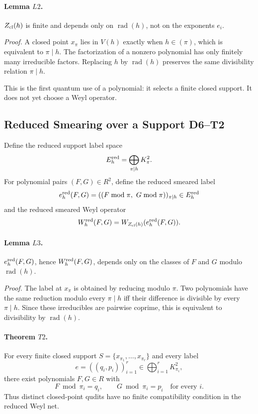 \paragraph{Lemma \(L2\).}
\(Z_{\rm cl}(h)\) is finite and depends only on \(\operatorname{rad}(h)\), not
on the exponents \(e_i\).

\emph{Proof.}
A closed point \(x_\pi\) lies in \(V(h)\) exactly when \(h\in(\pi)\), which is
equivalent to \(\pi\mid h\).  The factorization of a nonzero polynomial has
only finitely many irreducible factors.  Replacing \(h\) by
\(\operatorname{rad}(h)\) preserves the same divisibility relation
\(\pi\mid h\).

This is the first quantum use of a polynomial: it selects a finite closed
support.  It does not yet choose a Weyl operator.

\subsection{Reduced Smearing over a Support D6--T2}
Define the reduced support label space
\[
  E_h^{\rm red}=\bigoplus_{\pi\mid h}K_\pi^2.
\]
For polynomial pairs \((F,G)\in R^2\), define the reduced smeared label
\[
  e_h^{\rm red}(F,G)=((F\bmod\pi,\ G\bmod\pi))_{\pi\mid h}\in E_h^{\rm red}
\]
and the reduced smeared Weyl operator
\[
  W_h^{\rm red}(F,G)=W_{Z_{\rm cl}(h)}(e_h^{\rm red}(F,G)).
\]

\paragraph{Lemma \(L3\).}
\(e_h^{\rm red}(F,G)\), hence \(W_h^{\rm red}(F,G)\), depends only on the
classes of \(F\) and \(G\) modulo \(\operatorname{rad}(h)\).

\emph{Proof.}
The label at \(x_\pi\) is obtained by reducing modulo \(\pi\).  Two polynomials
have the same reduction modulo every \(\pi\mid h\) iff their difference is
divisible by every \(\pi\mid h\).  Since these irreducibles are pairwise
coprime, this is equivalent to divisibility by \(\operatorname{rad}(h)\).

\paragraph{Theorem \(T2\).}
For every finite closed support \(S=\{x_{\pi_1},\ldots,x_{\pi_r}\}\) and every
label
\[
  e=((q_i,p_i))_{i=1}^r\in\bigoplus_{i=1}^rK_{\pi_i}^2,
\]
there exist polynomials \(F,G\in R\) with
\[
  F\bmod\pi_i=q_i,\qquad G\bmod\pi_i=p_i
  \quad\text{for every }i.
\]
Thus distinct closed-point qudits have no finite compatibility condition in
the reduced Weyl net.

